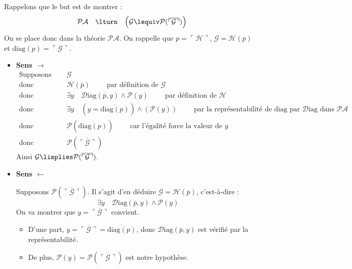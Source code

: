 \documentclass[11pt,class=report,crop=false]{standalone}
\begin{document}
Rappelons que le but est de montrer :
    \[ \mathcal{PA} \quad \lturn \quad \Big( \mathcal{G} \lequiv \mathcal{P}(\overline{\ulcorner \mathcal{G} \urcorner}) \Big) \]
    On se place donc dans la théorie $\mathcal{PA}$. On rappelle que $p = \ulcorner \mathcal{H} \urcorner$, $\mathcal{G} = \mathcal{H}(\overline{p})$ et $\text{diag}(p) = \ulcorner \mathcal{G} \urcorner$.

\begin{itemize}
    \item \textbf{Sens $\rightarrow$} 
    \begin{align*}
    \text{Supposons } \quad & \mathcal{G} \\
    \text{donc } \quad      & \mathcal{H}(\overline{p}) \qquad \text{ par définition de } \mathcal{G} \\
    \text{donc } \quad      & \exists y \quad \mathcal{D}\text{iag}(\overline{p},y) \land \mathcal{P}(y) \qquad \text{ par définition de } \mathcal{H} \\
    \text{donc } \quad      & \exists y \quad (y=\overline{\text{diag}(p)}) \land (\mathcal{P}(y)) \qquad \text{ par la représentabilité de } \text{diag} \text{ par } \mathcal{D}\text{iag} \text{ dans } \mathcal{PA} \\
    \text{donc } \quad      & \mathcal{P}(\overline{\text{diag}(p)}) \qquad \text{ car l'égalité force la valeur de } y \\
    \text{donc } \quad      & \mathcal{P}(\overline{\ulcorner \mathcal{G} \urcorner})
\end{align*}
Ainsi $\mathcal{G} \limplies \mathcal{P}(\overline{\ulcorner \mathcal{G} \urcorner})$.


    \item \textbf{Sens $\leftarrow$} 
    
    Supposons $\mathcal{P}(\overline{\ulcorner \mathcal{G} \urcorner})$. Il s'agit d'en déduire $\mathcal{G} = \mathcal{H}(\overline{p})$, c'est-à-dire :
    \[ \exists y \quad \mathcal{D}\text{iag}(\overline{p},y) \land \mathcal{P}(y) \]
    On va montrer que $y = \overline{\ulcorner \mathcal{G} \urcorner}$ convient. 


    \begin{itemize}
        \item D'une part, $y = \overline{\ulcorner \mathcal{G} \urcorner} = \overline{\text{diag}(p)}$, donc $\mathcal{D}\text{iag}(\overline{p},y)$ est vérifié par la représentabilité.

        \item De plus, $\mathcal{P}(y) = \mathcal{P}(\overline{\ulcorner \mathcal{G} \urcorner})$ est notre hypothèse.


\end{itemize}
\end{itemize}
\end{document}
